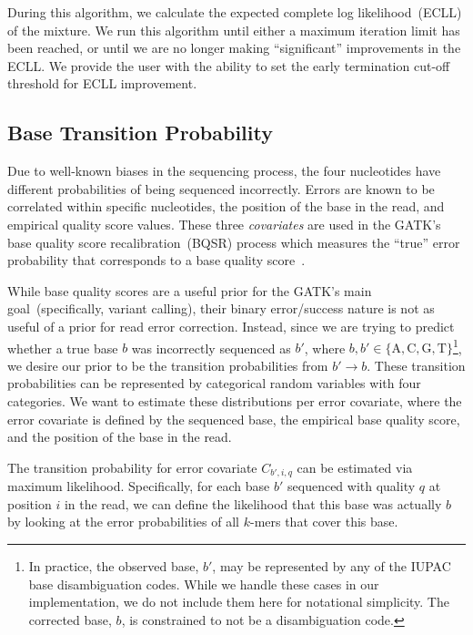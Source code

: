 \documentclass{llncs}
\begin{document}
During this algorithm, we calculate the expected complete log \linebreak likelihood~(ECLL) of the
mixture. We run this algorithm until either a maximum iteration limit has been reached, or until we are
no longer making ``significant'' improvements in the ECLL. We provide the user with the ability to set
the early termination cut-off threshold for ECLL improvement.

\subsection{Base Transition Probability}
\label{sec:transition-probability}

Due to well-known biases in the sequencing process, the four nucleotides have different probabilities
of being sequenced incorrectly. Errors are known to be correlated within specific nucleotides, the
position of the base in the read, and empirical quality score values. These three \emph{covariates} are
used in the GATK's base quality score recalibration~(BQSR) process which measures the ``true'' error
probability that corresponds to a base quality score~\cite{depristo11}.

While base quality scores are a useful prior for the GATK's main goal~(specifically, variant calling),
their binary error/success nature is not as useful of a prior for read error correction. Instead, since we
are trying to predict whether a true base $b$ was incorrectly sequenced as $b'$, where $b, b' \in
\{ \text{A}, \text{C}, \text{G}, \text{T} \}$\footnote{In practice, the observed base, $b'$, may be
represented by any of the IUPAC base disambiguation codes. While we handle these cases in our
implementation, we do not include them here for notational simplicity. The corrected base, $b$, is
constrained to not be a disambiguation code.}, we desire our prior to be the transition probabilities from
$b' \rightarrow b$. These transition probabilities can be represented by categorical random variables
with four categories. We want to estimate these distributions per error covariate, where the error
covariate is defined by the sequenced base, the empirical base quality score, and the position of the
base in the read.

The transition probability for error covariate $C_{b', i, q}$ can be estimated via maximum likelihood.
Specifically, for each base $b'$ sequenced with quality $q$ at position $i$ in the read, we can define
the likelihood that this base was actually $b$ by looking at the error probabilities of all $k$-mers that
cover this base.
\end{document}
